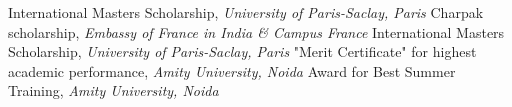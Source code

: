 %
%
%


\begin{scholarship}
					{International Master\textquotesingle s Scholarship, \textit{University of Paris-Saclay, Paris}}
					{{Charpak scholarship}, \textit{Embassy of France in India \& Campus France}}
					{International Master\textquotesingle s Scholarship, \textit{University of Paris-Saclay, Paris}}
					{"Merit Certificate" for highest academic performance, \textit{Amity University, Noida}}
					{Award for Best Summer Training, \textit{Amity University, Noida}}
\end{scholarship}